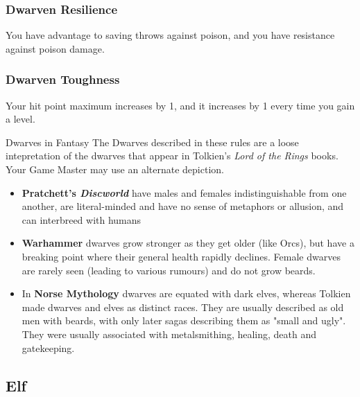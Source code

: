 \documentclass[10pt,twoside]{article}
\begin{document}
\begin{multicols}{2}
\subsubsection*{Dwarven Resilience}
You have advantage to saving throws against poison, and you have resistance against poison damage.

\subsubsection*{Dwarven Toughness}
Your hit point maximum increases by 1, and it increases by 1 every time you gain a level.

\begin{commentbox}{Dwarves in Fantasy}
The Dwarves described in these rules are a loose intepretation of the dwarves that appear in Tolkien's \textit{Lord of the Rings} books. Your Game Master may use an alternate depiction.

\begin{itemize}

\item \textbf{Pratchett's \textit{Discworld} } have males and females indistinguishable from one another, are literal-minded and have no sense of metaphors or allusion, and can interbreed with humans

\item \textbf{Warhammer} dwarves grow stronger as they get older (like Orcs), but have a breaking point where their general health rapidly declines. Female dwarves are rarely seen (leading to various rumours) and do not grow beards.

\item In \textbf{Norse Mythology} dwarves are equated with dark elves, whereas Tolkien made dwarves and elves as distinct races. They are usually described as old men with beards, with only later sagas describing them as "small and ugly". They were usually associated with metalsmithing, healing, death and gatekeeping.

\end{itemize}

\end{commentbox}

\end{multicols}

\newpage


\subsection{Elf}
\end{document}
